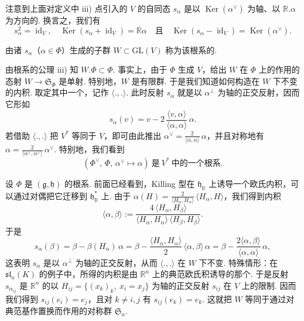 \begin{numpara}[Weyl 群]\label{np:lie-2-6-2}
注意到上面对定义中 iii) 点引入的 $V$ 的自同态 $s_{\alpha}$ 是以 $\operatorname{Ker}(\alpha^{\vee})$ 为轴、以 $\mathbb R.\alpha$ 为方向的. 换言之，我们有
\[
s_{\alpha}^{2}=\operatorname{id}_{V},\quad
\operatorname{Ker}(s_{\alpha}+\operatorname{id}_{V})=\mathbb R\alpha
\quad\text{且}\quad
\operatorname{Ker}(s_{\alpha}-\operatorname{id}_{V})=\operatorname{Ker}(\alpha^{\vee}).
\]
\begin{definition*}
由诸 $s_{\alpha}$（$\alpha\in\Phi$）生成的子群 $W\subset\mathrm{GL}(V)$ 称为该根系的.
\end{definition*}
由根系的公理 iii) 知 $W.\Phi\subset\Phi$. 事实上，由于 $\Phi$ 生成 $V$，给出 $W$ 在 $\Phi$ 上的作用的态射 $W\longrightarrow\mathfrak S_{\Phi}$ 是单射. 特别地，$W$ 是有限群. 于是我们知道如何构造在 $W$ 下不变的内积. 取定其中一个，记作 $\langle.,.\rangle$. 此时反射 $s_{\alpha}$ 就是以 $\alpha^{\perp}$ 为轴的正交反射，因而它形如
\[
s_{\alpha}(v)=v-2\,\frac{\langle v,\alpha\rangle}{\langle\alpha,\alpha\rangle}\,\alpha.
\]
若借助 $\langle.,.\rangle$ 把 $V^{*}$ 等同于 $V$，即可由此推出 $\alpha^{\vee}=\frac{2}{\langle\alpha,\alpha\rangle}\,\alpha$，并且对称地有 $\alpha=\frac{2}{\langle\alpha^{\vee},\alpha^{\vee}\rangle}\,\alpha^{\vee}$. 特别地，我们看到
\[
(\Phi^{\vee},\,\Phi,\,\alpha^{\vee}\mapsto\alpha)\ \text{是}\ V^{*}\ \text{中的一个根系}.
\]
\begin{example*}
设 $\Phi$ 是 $(\mathfrak g,\mathfrak h)$ 的根系. 前面已经看到，Killing 型在 $\mathfrak h_{\mathbb R}$ 上诱导一个欧氏内积，可以通过对偶把它迁移到 $\mathfrak h_{\mathbb R}^{*}$ 上. 由于 $\alpha(H)=\frac{2}{\langle H_{\alpha},H_{\alpha}\rangle}\,\langle H_{\alpha},H\rangle$，我们得到内积
\[
\langle\alpha,\beta\rangle:=\frac{4\,\langle H_{\alpha},H_{\beta}\rangle}{\langle H_{\alpha},H_{\alpha}\rangle\,\langle H_{\beta},H_{\beta}\rangle}.
\]
于是
\[
s_{\alpha}(\beta)=\beta-\beta(H_{\alpha})\,\alpha
=\beta-\frac{\langle H_{\alpha},H_{\alpha}\rangle}{2}\,\langle\alpha,\beta\rangle\,\alpha
=\beta-\frac{2\langle\alpha,\beta\rangle}{\langle\alpha,\alpha\rangle}\,\alpha,
\]
这表明 $s_{\alpha}$ 是以 $\alpha^{\perp}$ 为轴的正交反射，从而 $\langle.,.\rangle$ 在 $W$ 下不变.
特殊情形：在 $\mathfrak{sl}_{n}(K)$ 的例子中，所得的内积是由 $\mathbb R^{n}$ 上的典范欧氏积诱导的那个. 于是反射 $s_{\alpha_{ij}}$ 是 $\mathbb R^{n}$ 的以 $H_{ij}=\{(x_{k})_{k},\ x_{i}=x_{j}\}$ 为轴的正交反射 $s_{ij}$ 在 $V$ 上的限制. 因而我们得到 $s_{ij}(e_{i})=e_{j}$，且对 $k\neq i,j$ 有 $s_{ij}(e_{k})=e_{k}$. 这就把 $W$ 等同于通过对典范基作置换而作用的对称群 $\mathfrak S_{n}$.
\end{example*}
\end{numpara}

